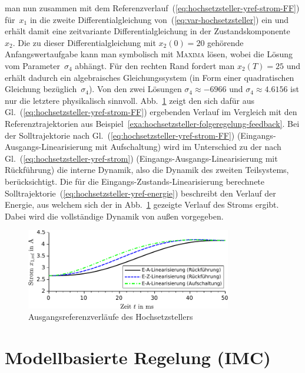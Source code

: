 \begin{example}
man nun zusammen mit dem Referenzverlauf~(\ref{eq:hochsetzsteller-yref-strom-FF})
für~$x_{1}$ in die zweite Differentialgleichung von~(\ref{eq:var-hochsetzsteller})
ein und erhält damit eine zeitvariante Differentialgleichung in der
Zustandskomponente~$x_{2}$. Die zu dieser Differentialgleichung
mit $x_{2}(0)=20$ gehörende Anfangswertaufgabe kann man symbolisch
mit \textsc{Maxima} lösen, wobei die Lösung vom Parameter~$\sigma_{4}$
abhängt. Für den rechten Rand fordert man $x_{2}(T)=25$ und erhält
dadurch ein algebraisches Gleichungssystem (in Form einer quadratischen
Gleichung bezüglich~$\sigma_{4}$). Von den zwei Lösungen $\sigma_{4}\approx-6966$
und $\sigma_{4}\approx4.6156$ ist nur die letztere physikalisch sinnvoll.
Abb.~\ref{fig:Hochsetzsteller-Tracking-Strom-FB-FF} zeigt den sich
dafür aus Gl.~(\ref{eq:hochsetzsteller-yref-strom-FF}) ergebenden
Verlauf im Vergleich mit den Referenztrajektorien aus Beispiel~\ref{exa:hochsetzsteller-folgeregelung-feedback}.
Bei der Solltrajektorie nach Gl.~(\ref{eq:hochsetzsteller-yref-strom-FF})
(Eingangs-Ausgangs-Linearisierung mit Aufschaltung) wird im Unterschied
zu der nach Gl.~(\ref{eq:hochsetzsteller-yref-strom}) (Eingangs-Ausgangs-Linearisierung
mit Rückführung) die interne Dynamik, also die Dynamik des zweiten
Teilsystems, berücksichtigt. Die für die Eingangs-Zustands-Linearisierung
berechnete Solltrajektorie~(\ref{eq:hochsetzsteller-yref-energie})
beschreibt den Verlauf der Energie, aus welchem sich der in Abb.~\ref{fig:Hochsetzsteller-Tracking-Strom-FB-FF}
gezeigte Verlauf des Stroms ergibt. Dabei wird die vollständige Dynamik
von außen vorgegeben.
\end{example}
\begin{figure}
\begin{centering}
\includegraphics[width=0.8\textwidth]{Hochsetzsteller_Tracking_Strom}
\par\end{centering}
\caption{Ausgangsreferenzverläufe des Hochsetzstellers\label{fig:Hochsetzsteller-Tracking-Strom-FB-FF}}
\end{figure}


\section{Modellbasierte Regelung (IMC)\label{sec:Modellbasierte-Regelung-IMC}}

